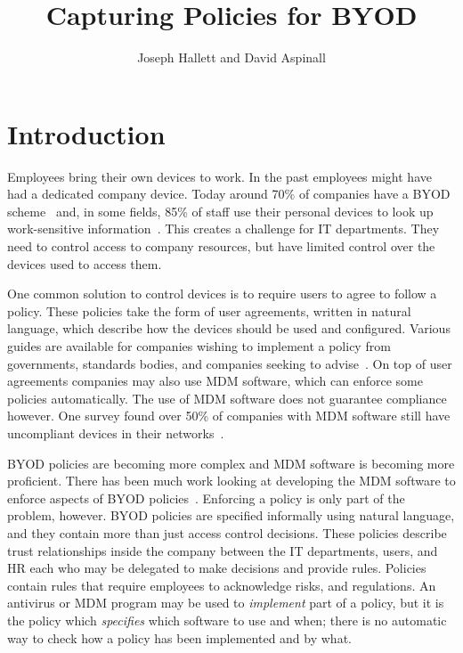 \documentclass{article}
\title{Capturing Policies for BYOD}
\author{Joseph Hallett and David Aspinall}
\begin{document}
\maketitle

\begin{abstract}
\end{abstract}

\section{Introduction}
\label{sec:intro}

Employees bring their own devices to work.  
In the past employees might have had a dedicated company device. 
Today around 70\% of companies have a BYOD scheme~\cite{schulze_byod_2016} and, in some fields,
  85\% of staff use their personal devices to look up work-sensitive information~\cite{patel_uk_2015}. 
This creates a challenge for IT departments.
They need to control access to company resources, but have limited control over the devices used to access them.

One common solution to control devices is to require users to agree to follow a policy.
These policies take the form of user agreements, written in natural language, which describe how the devices should be used and configured.
Various guides are available for companies wishing to implement a policy from governments, standards bodies, and companies seeking to advise~\cite{nicholas_r._c._guerin_security_2008,souppaya_guidelines_????,hp_byod_????,cesg_byod_2015}.
On top of user agreements companies may also use \ac{MDM} software, which can enforce some policies automatically.
The use of \ac{MDM} software does not guarantee compliance however.
One survey found over 50\% of companies with \ac{MDM} software still have uncompliant devices in their networks~\cite{mobileiron_security_labs_q4_2015}.

BYOD policies are becoming more complex and \ac{MDM} software is becoming more proficient.
There has been much work looking at developing the \ac{MDM} software to enforce aspects of BYOD policies~\cite{costantino_towards_2013,martinelli_enhancing_2016,armando_enabling_2014}.
Enforcing a policy is only part of the problem, however.
BYOD policies are specified informally using natural language, and they contain more than just access control decisions.
These policies describe trust relationships inside the company between the IT departments, users, and HR each who may be delegated to make decisions and provide rules.
Policies contain rules that require employees to acknowledge risks, and regulations.
An antivirus or \ac{MDM} program may be used to \emph{implement} part of a policy, but it is the policy which \emph{specifies} which software to use and when; there is no automatic way to check how a policy has been implemented and by what.
\end{document}
